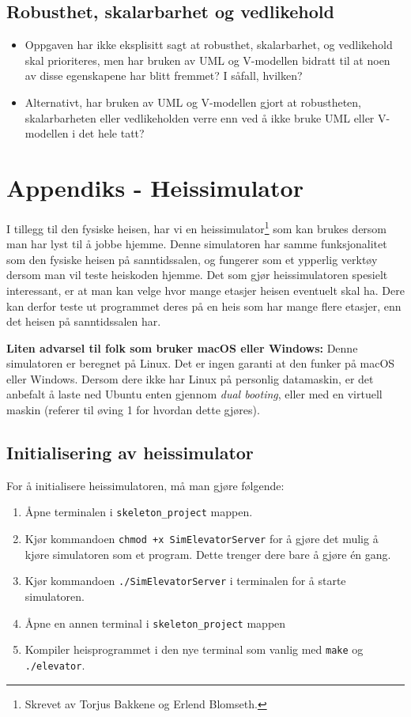\subsection{Robusthet, skalarbarhet og vedlikehold}


\begin{itemize}
    \item Oppgaven har ikke eksplisitt sagt at robusthet, skalarbarhet, og vedlikehold skal prioriteres, men har bruken av UML og V-modellen bidratt til at noen av disse egenskapene har blitt fremmet? I såfall, hvilken?
    \item Alternativt, har bruken av UML og V-modellen gjort at robustheten, skalarbarheten eller vedlikeholden verre enn ved å ikke bruke UML eller V-modellen i det hele tatt?
\end{itemize}


\section{Appendiks - Heissimulator   }\label{app:SImulator}

I tillegg til den fysiske heisen, har vi en heissimulator\footnote{Skrevet av Torjus Bakkene og Erlend Blomseth.} som kan brukes dersom man har lyst til å jobbe hjemme. Denne simulatoren har samme funksjonalitet som den fysiske heisen på sanntidssalen, og fungerer som et ypperlig verktøy dersom man vil teste heiskoden hjemme. Det som gjør heissimulatoren spesielt interessant, er at man kan velge hvor mange etasjer heisen eventuelt skal ha. Dere kan derfor teste ut programmet deres på en heis som har mange flere etasjer, enn det heisen på sanntidssalen har.

\textbf{Liten advarsel til folk som bruker macOS eller Windows:} Denne simulatoren er beregnet på Linux. Det er ingen garanti at den funker på macOS eller Windows. Dersom dere ikke har Linux på personlig datamaskin, er det anbefalt å laste ned Ubuntu enten gjennom \textit{dual booting}, eller med en virtuell maskin (referer til øving 1 for hvordan dette gjøres).



\subsection{Initialisering av heissimulator}
For å initialisere heissimulatoren, må man gjøre følgende:

\begin{enumerate}
    \item Åpne terminalen i \verb|skeleton_project| mappen.
    \item  Kjør kommandoen \verb|chmod +x SimElevatorServer| for å gjøre det mulig å kjøre simulatoren som et program. Dette trenger dere bare å gjøre én gang.
    \item Kjør kommandoen \verb|./SimElevatorServer| i terminalen for å starte simulatoren.
    \item Åpne en annen terminal i \verb|skeleton_project| mappen
    \item Kompiler heisprogrammet i den nye terminal som vanlig med \verb|make| og \verb|./elevator|.
\end{enumerate}



